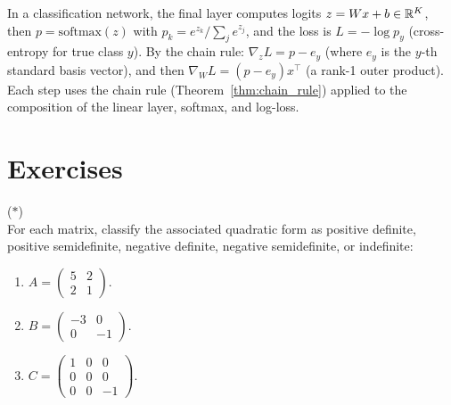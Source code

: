 \documentclass[11pt,a4paper]{article}
\begin{document}
\begin{example}
\label{ex:softmax}
In a classification network, the final layer computes logits
$z = Wx + b \in \mathbb{R}^K$, then $p = \mathrm{softmax}(z)$ with
$p_k = e^{z_k}/\sum_j e^{z_j}$, and the loss is
$L = -\log p_y$ (cross-entropy for true class $y$).  By the chain
rule: $\nabla_z L = p - e_y$ (where $e_y$ is the $y$-th standard
basis vector), and then $\nabla_W L = (p - e_y)x^\top$ (a rank-1
outer product).  Each step uses the chain rule
(Theorem~\ref{thm:chain_rule}) applied to the composition of the
linear layer, softmax, and log-loss.
\end{example}

\section{Exercises}
\label{sec:exercises}

\begin{exercise}
\label{exer:qf}
\textnormal{(\(*\))} \\
For each matrix, classify the associated quadratic form as positive
definite, positive semidefinite, negative definite, negative
semidefinite, or indefinite:
\begin{enumerate}[nosep,label=(\alph*)]
  \item $A = \begin{pmatrix} 5 & 2 \\ 2 & 1 \end{pmatrix}$.
  \item $B = \begin{pmatrix} -3 & 0 \\ 0 & -1 \end{pmatrix}$.
  \item $C = \begin{pmatrix} 1 & 0 & 0 \\ 0 & 0 & 0 \\ 0 & 0 & -1 \end{pmatrix}$.
\end{enumerate}
\end{exercise}
\end{document}
